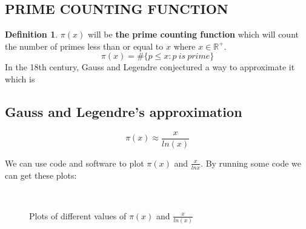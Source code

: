 \documentclass[12pt]{amsart} %
\theoremstyle{definition}
\newtheorem{definition}[thm]{Definition}
\theoremstyle{remark}
\numberwithin{equation}{section}
\begin{document}
\subsection{PRIME COUNTING FUNCTION}
\begin{definition}
$\pi(x)$ will be \textbf{the prime counting function} which will count the number of primes less than or equal to $x$ where $x\in \mathbb{R^+}$.
$$\pi(x) = \#\{p\le x:p \ is \ prime\} $$ 
In the 18th century, Gauss and Legendre conjectured a way to approximate it which is
\subsection{Gauss and Legendre's approximation}
$$ \pi(x) \approx \frac{x}{ln(x)}  $$

We can use code and software to plot $\pi(x)$ and $\frac{x}{lnx}$. By running some code \cite{kadkhodazadeh2023riemanncode} we can get these plots:



\begin{figure}[h!]
        \hfill
        \\
        \hfill
        \caption{Plots of different values of $\pi(x)$ and $\frac{x}{ln(x)}$}
        \label{fig:fig}
    \end{figure}


\end{definition}
\end{document}
